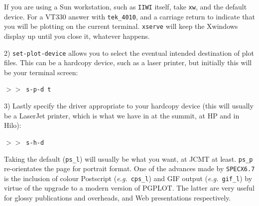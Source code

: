 \documentclass[11pt,twoside]{starlink}
\providecommand{\eg}{\textit{e.g.}}
\providecommand{\SPECX}{\texttt{SPECX}}
\providecommand{\SP}{{$>\!>$}}
\begin{document}
If you are using a Sun workstation, such as \texttt{IIWI} itself, take
\texttt{xw}, and the default device. For a VT330 answer with
\texttt{tek\_4010}, and a carriage return to indicate that you will be
plotting on the current terminal. \texttt{xserve} will keep the Xwindows
display up until you close it, whatever happens.

2) \texttt{set-plot-device} allows you to select the eventual intended
destination of plot files.  This can be a hardcopy device, such as a
laser printer, but initially this will be your terminal screen:

\SP\  \texttt{s-p-d  t}

3) Lastly specify the driver appropriate to your hardcopy device (this
will usually be a LaserJet printer, which is what we have in at the
summit, at HP and in Hilo):

\SP\  \texttt{s-h-d}

Taking the default ({\tt{ps\_l}}) will usually be what you want, at JCMT at
least. \texttt{ps\_p} re-orientates the page for portrait format.  One of the
advances made by \SPECX \texttt{6.7} is the inclusion of colour Postscript
(\eg\ \texttt{cps\_l}) and GIF output (\eg\ \texttt{gif\_l}) by virtue of the
upgrade to a modern version of PGPLOT. The latter are very useful for
glossy publications and overheads, and Web presentations respectively.
\end{document}
